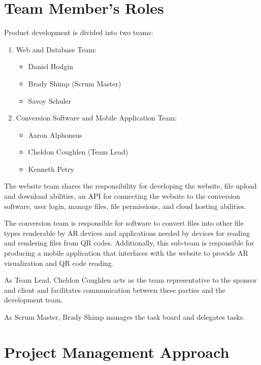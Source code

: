 
\section{Team Member's Roles}

Product development is divided into two teams:
\begin{enumerate}
    \item Web and Database Team:
        \begin{itemize}
            \item Daniel Hodgin
            \item Brady Shimp (Scrum Master)
            \item Savoy Schuler
        \end{itemize}
    \item Conversion Software and Mobile Application Team:
        \begin{itemize}
            \item Aaron Alphonsus
            \item Cheldon Coughlen (Team Lead)
            \item Kenneth Petry
        \end{itemize}
\end{enumerate}

The website team shares the responsibility for developing the website, file upload and download abilities, an API for connecting the website to the conversion software, user login,  manage files, file permissions, and cloud hosting abilities.  


The conversion team is responsible for software to convert files into other file types renderable by AR devices and applications needed by devices for reading and rendering files from QR codes.  Additionally,  this sub-team is responsible for producing a mobile application that interfaces with the website to provide AR visualization and QR code reading.


As Team Lead, Cheldon Coughlen acts as the team representative to the sponsor and client and facilitates communication between these parties and the development team. 

As Scrum Master, Brady Shimp manages the task board and delegates tasks. 

\section{Project Management Approach}

